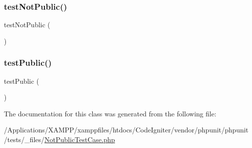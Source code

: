 \subsubsection{\texorpdfstring{test\+Not\+Public()}{testNotPublic()}}
{\footnotesize\ttfamily test\+Not\+Public (\begin{DoxyParamCaption}{ }\end{DoxyParamCaption})\hspace{0.3cm}{\ttfamily [protected]}}

\mbox{\label{class_not_public_test_case_a5f09a836d15014038b762bf8d62c156a}} 
\subsubsection{\texorpdfstring{test\+Public()}{testPublic()}}
{\footnotesize\ttfamily test\+Public (\begin{DoxyParamCaption}{ }\end{DoxyParamCaption})}



The documentation for this class was generated from the following file\+:\begin{DoxyCompactItemize}
\item 
/\+Applications/\+X\+A\+M\+P\+P/xamppfiles/htdocs/\+Code\+Igniter/vendor/phpunit/phpunit/tests/\+\_\+files/\mbox{\hyperlink{_not_public_test_case_8php}{Not\+Public\+Test\+Case.\+php}}\end{DoxyCompactItemize}
